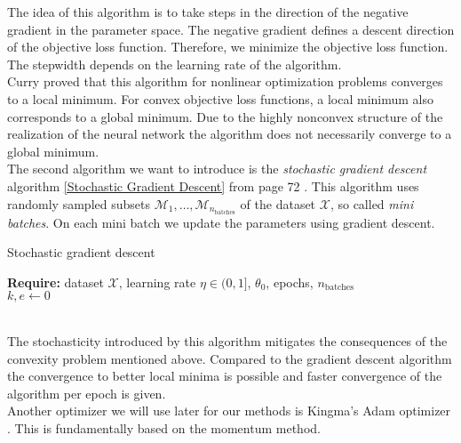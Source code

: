\documentclass[11pt,titlepage]{article}
\theoremstyle{definition}
\theoremstyle{remark}
\begin{document}
	The idea of this algorithm is to take steps in the direction of the negative gradient in the parameter space. The negative gradient defines a descent direction of the objective loss function. Therefore, we minimize the objective loss function. The stepwidth depends on the learning rate of the algorithm.\\
	Curry \cite{Curry1944} proved that this algorithm for nonlinear optimization problems converges to a local minimum. For convex objective loss functions, a local minimum also corresponds to a global minimum. Due to the highly nonconvex structure of the realization of the neural network the algorithm does not necessarily converge to a global minimum. \\
	The second algorithm we want to introduce is the \textsl{stochastic gradient descent} algorithm \ref{Stochastic Gradient Descent} from page 72 \cite{Kingma2019VAE}. This algorithm uses 
	randomly sampled subsets $\mathcal{M}_1,\ldots,\mathcal{M}_{n_{\mathrm{batches}}}$ of the 
	dataset $\mathcal{X}$, so called \textsl{mini batches}. On each mini batch we update 
	the parameters using gradient descent.
	\begin{algorithm}
		\caption{Stochastic gradient descent} \label{Stochastic Gradient Descent}
		\textbf{Require:} dataset $\mathcal{X}$, learning rate $\eta\in (0,1]$, $\theta_0$, epochs, $n_{\mathrm{batches}}$\\
		$k,e\gets 0$\\
	\end{algorithm}
	\\
	The stochasticity introduced by this algorithm mitigates the consequences of the convexity problem mentioned above. Compared to the gradient descent algorithm the convergence to better local minima is possible and faster convergence of the algorithm per epoch is given. \\
	Another optimizer we will use later for our methods is Kingma's Adam optimizer \cite{Kingma2014Adam}. This is fundamentally based on the momentum method.
	
\end{document}
